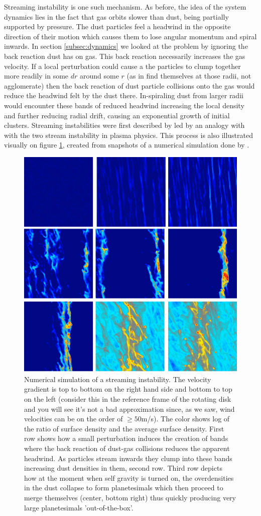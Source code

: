 \documentclass[12pt]{article}
\begin{document}
Streaming instability is one such mechanism. As before, the idea of the system dynamics lies in the fact that gas orbits slower than dust, being partially supported by pressure. The dust particles feel a headwind in the opposite direction of their motion which causes them to lose angular momentum and spiral inwards. In section \ref{subsec:dynamics} we looked at the problem by ignoring the back reaction dust has on gas. This back reaction necessarily increases the gas velocity. If a local perturbation could cause a the particles to clump together more readily in some $dr$ around some $r$ (as in find themselves at those radii, not agglomerate) then the back reaction of dust particle collisions onto the gas would reduce the headwind felt by the dust there. In-spiraling dust from larger radii would encounter these bands of reduced headwind increasing the local density and further reducing radial drift, causing an exponential growth of initial clusters. Streaming instabilities were first described by \citet{Youdin05} led by an analogy with with the two stream instability in plasma physics. This process is also illustrated visually on figure \ref{fig:streaminginstabsim}, created from snapshots of a numerical simulation done by \cite{Simon16}.
\begin{figure}[htbp]
    \label{fig:streaminginstabsim}
    \centering
    \includegraphics[width=0.55\linewidth]{images/streaminginstabsim.png}
    \caption{Numerical simulation of a streaming instability. The velocity gradient is top to bottom on the right hand side and bottom to top on the left (consider this in the reference frame of the rotating disk and you will see it's not a bad approximation since, as we saw, wind velocities can be on the order of $\ge 50$m/s). The color shows log of the ratio of surface density and the average surface density. First row shows how a small perturbation induces the creation of bands where the back reaction of dust-gas collisions reduces the apparent headwind. As particles stream inwards they clump into these bands increasing dust densities in them, second row. Third row depicts how at the moment when self gravity is turned on, the overdensities in the dust collapse to form planetesimals which then proceed to merge themselves (center, bottom right) thus quickly producing very large planetesimals 'out-of-the-box'.}
\end{figure}
\end{document}
